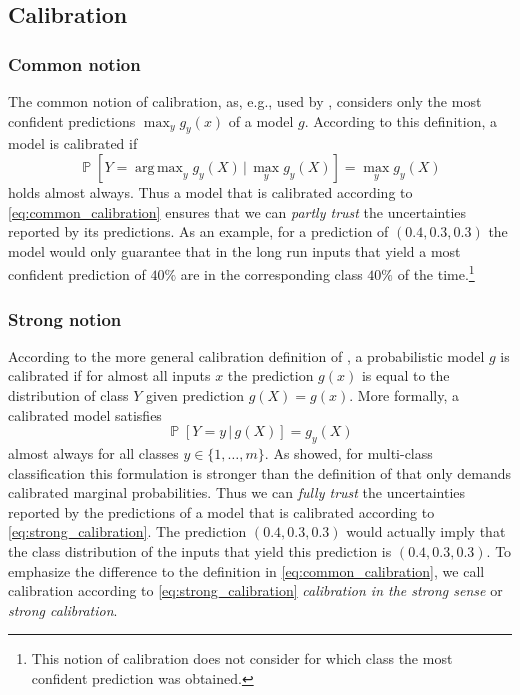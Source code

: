 \documentclass{article}
\DeclareMathOperator{\Prob}{\mathbb{P}}
\DeclareMathOperator*{\argmax}{arg\,max}
\newcommand{\given}{\,|\,}
\begin{document}
\subsection{Calibration}

\subsubsection{Common notion}

The common notion of calibration, as, e.g., used by \citet{guo17_calib_moder_neural_networ},
considers only the most confident predictions $\max_y g_y(x)$ of a model $g$.
According to this definition, a model is calibrated if
\begin{equation}\label{eq:common_calibration}
    \Prob[Y = \argmax_y g_y(X) \given \max_y g_y(X)] = \max_y g_y(X)
\end{equation}
holds almost always. Thus a model that is calibrated according to
\cref{eq:common_calibration} ensures that we can \emph{partly trust} the
uncertainties reported by its predictions. As an example, for a prediction of
$(0.4, 0.3, 0.3)$ the model would only guarantee that in the long run inputs that
yield a most confident prediction of $40\%$ are in the corresponding class $40\%$
of the time.\footnote{This notion of calibration does not consider for which class
the most confident prediction was obtained.}

\subsubsection{Strong notion}

According to the more general calibration definition of
\citet{broecker09_reliab_suffic_decom_proper_scores,vaicenavicius19_evaluat}, a
probabilistic model $g$ is calibrated if for almost all inputs $x$ the
prediction $g(x)$ is equal to the distribution of class $Y$ given prediction
$g(X) = g(x)$. More formally, a calibrated model satisfies
\begin{equation}\label{eq:strong_calibration}
  \Prob[Y = y \given g(X)] = g_y(X)
\end{equation}
almost always for all classes $y \in \{1,\ldots,m\}$. As
\citet{vaicenavicius19_evaluat} showed, for multi-class classification
this formulation is stronger than the definition of \citet{zadrozny02_trans} that
only demands calibrated marginal probabilities. Thus we can \emph{fully trust}
the uncertainties reported by the predictions of a model that is calibrated
according to \cref{eq:strong_calibration}. The prediction $(0.4, 0.3, 0.3)$
would actually imply that the class distribution of the inputs that yield this
prediction is $(0.4, 0.3, 0.3)$. To emphasize the difference to the definition
in \cref{eq:common_calibration}, we call calibration according to
\cref{eq:strong_calibration} \emph{calibration in the strong sense} or
\emph{strong calibration}.
\end{document}
